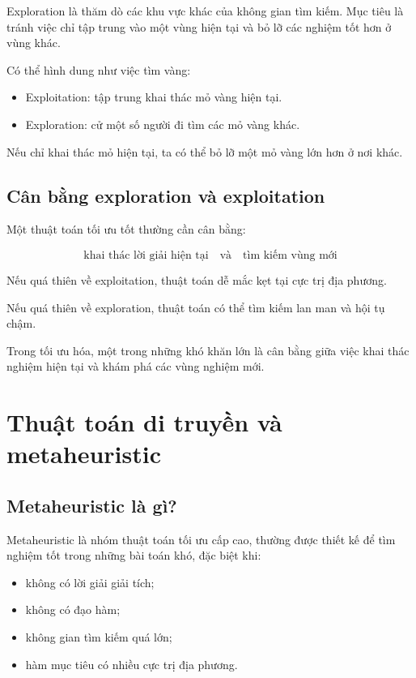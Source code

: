 Exploration là thăm dò các khu vực khác của không gian tìm kiếm. Mục tiêu là tránh việc chỉ tập trung vào một vùng hiện tại và bỏ lỡ các nghiệm tốt hơn ở vùng khác.

\begin{vidu}
Có thể hình dung như việc tìm vàng:

\begin{itemize}
    \item Exploitation: tập trung khai thác mỏ vàng hiện tại.
    \item Exploration: cử một số người đi tìm các mỏ vàng khác.
\end{itemize}

Nếu chỉ khai thác mỏ hiện tại, ta có thể bỏ lỡ một mỏ vàng lớn hơn ở nơi khác.
\end{vidu}

\subsection{Cân bằng exploration và exploitation}

Một thuật toán tối ưu tốt thường cần cân bằng:

\[
    \text{khai thác lời giải hiện tại}
    \quad \text{và} \quad
    \text{tìm kiếm vùng mới}
\]

Nếu quá thiên về exploitation, thuật toán dễ mắc kẹt tại cực trị địa phương.

Nếu quá thiên về exploration, thuật toán có thể tìm kiếm lan man và hội tụ chậm.

\begin{ghinho}
Trong tối ưu hóa, một trong những khó khăn lớn là cân bằng giữa việc khai thác nghiệm hiện tại và khám phá các vùng nghiệm mới.
\end{ghinho}

\section{Thuật toán di truyền và metaheuristic}

\subsection{Metaheuristic là gì?}

Metaheuristic là nhóm thuật toán tối ưu cấp cao, thường được thiết kế để tìm nghiệm tốt trong những bài toán khó, đặc biệt khi:

\begin{itemize}
    \item không có lời giải giải tích;
    \item không có đạo hàm;
    \item không gian tìm kiếm quá lớn;
    \item hàm mục tiêu có nhiều cực trị địa phương.
\end{itemize}

